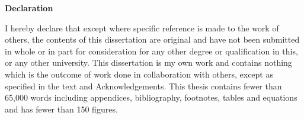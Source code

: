 \pagebreak
\hspace{0pt}
\vfill

\begin{center}
 \textbf{Declaration} 
\end{center}
        \vspace{3cm}


I hereby declare that except where specific reference is made to the work of 
others, the contents of this dissertation are original and have not been 
submitted in whole or in part for consideration for any other degree or 
qualification in this, or any other university. This dissertation is my own 
work and contains nothing which is the outcome of work done in collaboration 
with others, except as specified in the text and Acknowledgements. This 
thesis contains fewer than 65,000 words including appendices, 
bibliography, footnotes, tables and equations and has fewer than 150 figures.


\vfill
\hspace{0pt}
\pagebreak

